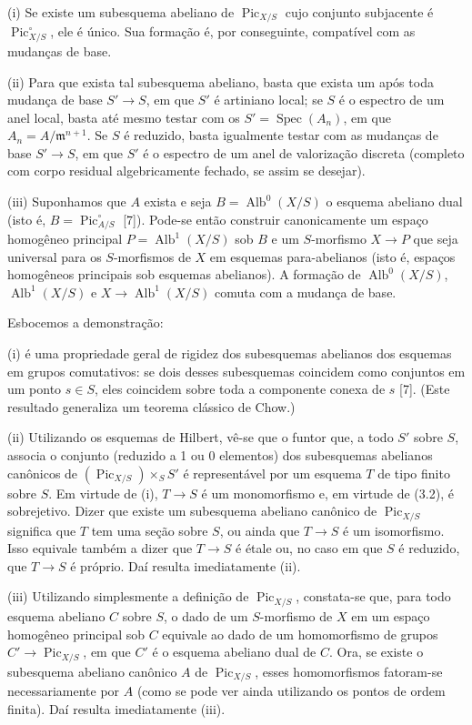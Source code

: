 \noindent(i) Se existe um subesquema abeliano de
$\operatorname{Pic}_{X/S}$ cujo conjunto subjacente é
$\operatorname{Pic}_{X/S}^\circ$, ele é único. Sua formação é, por
conseguinte, compatível com as mudanças de base.

\noindent(ii) Para que exista tal subesquema abeliano, basta que exista um
após toda mudança de base $S'\longrightarrow S$, em que $S'$ é artiniano
local; se $S$ é o espectro de um anel local, basta até mesmo testar com os
$S'=\operatorname{Spec}(A_n)$, em que $A_n=A/\mathfrak m^{n+1}$. Se $S$ é
reduzido, basta igualmente testar com as mudanças de base
$S'\longrightarrow S$, em que $S'$ é o espectro de um anel de valorização
discreta (completo com corpo residual algebricamente fechado, se assim se
desejar).

\noindent(iii) Suponhamos que $A$ exista e seja
$B=\operatorname{Alb}^0(X/S)$ o esquema abeliano dual (isto é,
$B=\operatorname{Pic}_{A/S}^\circ$ [7]). Pode-se então construir
canonicamente um espaço homogêneo principal
$P=\operatorname{Alb}^1(X/S)$ sob $B$ e um $S$-morfismo
$X\longrightarrow P$ que seja universal para os $S$-morfismos de $X$ em
esquemas para-abelianos (isto é, espaços homogêneos principais sob esquemas
abelianos). A formação de $\operatorname{Alb}^0(X/S)$,
$\operatorname{Alb}^1(X/S)$ e
$X\longrightarrow\operatorname{Alb}^1(X/S)$ comuta com a mudança de base.

Esbocemos a demonstração:

(i) é uma propriedade geral de rigidez dos subesquemas abelianos dos esquemas
em grupos comutativos: se dois desses subesquemas coincidem como conjuntos em
um ponto $s\in S$, eles coincidem sobre toda a componente
conexa de $s$ [7]. (Este resultado generaliza um teorema clássico de Chow.)

(ii) Utilizando os esquemas de Hilbert, vê-se que o funtor que, a todo $S'$
sobre $S$, associa o conjunto (reduzido a 1 ou 0 elementos) dos subesquemas
abelianos canônicos de $(\operatorname{Pic}_{X/S})\times_S S'$ é
representável por um esquema $T$ de tipo finito sobre $S$. Em virtude de (i),
$T\longrightarrow S$ é um monomorfismo e, em virtude de (3.2), é
sobrejetivo. Dizer que existe um subesquema abeliano canônico de
$\operatorname{Pic}_{X/S}$ significa que $T$ tem uma seção sobre $S$, ou ainda
que $T\longrightarrow S$ é um isomorfismo. Isso equivale também a dizer que
$T\longrightarrow S$ é étale ou, no caso em que $S$ é reduzido, que
$T\longrightarrow S$ é próprio. Daí resulta imediatamente (ii).

(iii) Utilizando simplesmente a definição de $\operatorname{Pic}_{X/S}$,
constata-se que, para todo esquema abeliano $C$ sobre $S$, o dado de um
$S$-morfismo de $X$ em um espaço homogêneo principal sob $C$ equivale ao dado
de um homomorfismo de grupos
$C'\longrightarrow\operatorname{Pic}_{X/S}$, em que $C'$ é o esquema abeliano
dual de $C$. Ora, se existe o subesquema abeliano canônico $A$ de
$\operatorname{Pic}_{X/S}$, esses homomorfismos fatoram-se necessariamente por
$A$ (como se pode ver ainda utilizando os pontos de ordem finita). Daí resulta
imediatamente (iii).

